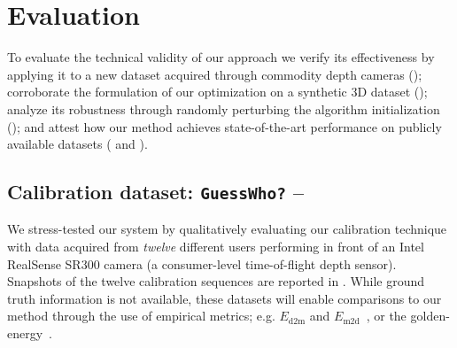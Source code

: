 \section{Evaluation}
To evaluate the technical validity of our approach we verify its effectiveness by applying it to a new dataset acquired through commodity depth cameras (); corroborate the formulation of our optimization on a synthetic 3D dataset (); analyze its robustness through randomly perturbing the algorithm initialization (); and attest how our method achieves state-of-the-art performance on publicly available datasets ( and ).

\subsection{Calibration dataset: \texttt{GuessWho?} -- } 
\label{sec:evaldataset}
We stress-tested our system by qualitatively evaluating our calibration technique with data acquired from \emph{twelve} different users performing in front of an Intel RealSense SR300 camera (a consumer-level time-of-flight depth sensor). Snapshots of the twelve calibration sequences are reported in .
While ground truth information is not available, these datasets will enable comparisons to our method through the use of empirical metrics; e.g. $E_\text{d2m}$ and $E_\text{m2d}$~\cite{tkach2016sphere}, or the golden-energy~\cite{taylor2016joint}.

